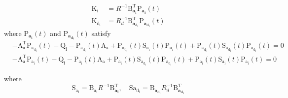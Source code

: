 \documentclass[3p,times]{elsarticle}
\begin{document}
\begin{align}
	\boldsymbol{{\mathrm{K_i}}} &= {{{R}}^{-1}}\boldsymbol{{\mathrm{B}_{a_i}^\mathrm{T}}}\boldsymbol{{\mathrm{P}}_{a_i}}(t)\\
	\boldsymbol{{\mathrm{K_{d_i}}}} &= {{{R}}^{-1}_{d}}\boldsymbol{{\mathrm{B}_{a_{d_i}}^\mathrm{T}}}\boldsymbol{{\mathrm{P}}_{a_{d_i}}}(t)
\end{align}
where $\boldsymbol{{\mathrm{P}}_{a_i}}(t)$ and $\boldsymbol{{\mathrm{P}}_{a_{d_i}}}(t)$ satisfy
\begin{align}\label{coupled_riccatti_LQIDG}
	&-\boldsymbol{\mathrm{A^\mathrm{T}_a}}\boldsymbol{\mathrm{P_{a_{d_i}}}}(t)
	 - \boldsymbol{\mathrm{Q_{i}}} - \boldsymbol{\mathrm{P_{a_{d_i}}}}(t)\boldsymbol{\mathrm{A_a}} 
	 + \boldsymbol{\mathrm{P_{a_{d_i}}}}(t)\boldsymbol{\mathrm{S_{a_i}}}(t)\boldsymbol{\mathrm{P_{a_i}}}(t)
	  +\boldsymbol{\mathrm{P_{a_{d_i}}}}(t)\boldsymbol{\mathrm{S_{a_{d_i}}}}(t)\boldsymbol{\mathrm{P_{a_{d_i}}}}(t)
	=\boldsymbol{\mathrm{0}}\\
            &-\boldsymbol{\mathrm{A^\mathrm{T}_a}}\boldsymbol{\mathrm{P_{a_i}}}(t) - \boldsymbol{\mathrm{Q_i}}
			 - \boldsymbol{\mathrm{P_{a_i}}}(t)\boldsymbol{\mathrm{A_a}}  +
			  \boldsymbol{\mathrm{P_{a_i}}}(t)\boldsymbol{\mathrm{S_{a_{d_i}}}}(t)\boldsymbol{\mathrm{P_{a_{d_i}}}}(t) 
			  +\boldsymbol{\mathrm{P_{a_i}}}(t)\boldsymbol{\mathrm{S_{a_i}}}(t)\boldsymbol{\mathrm{P_{a_i}}}(t) =\boldsymbol{\mathrm{0}}
\end{align}

where $$
	\boldsymbol{\mathrm{S_{a_i}}} = \boldsymbol{\mathrm{B_{a_i}}}R^{-1}\boldsymbol{\mathrm{B}^\mathrm{T}_{a_i}}, \quad
	\boldsymbol{\mathrm{S{a_{d_i}}}} = \boldsymbol{\mathrm{B}_{a_{d_i}}}R_{d}^{-1}\boldsymbol{\mathrm{B}^\mathrm{T}_{a_{d_i}}}
$$
\end{document}
